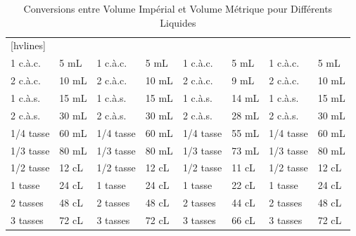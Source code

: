 \begin{table}
	\centering
	\caption{Conversions entre Volume Impérial et Volume Métrique pour Différents Liquides}
	\def\arraystretch{2}
	\begin{NiceTabular}{*{8}{m{.1\textwidth}}}[hvlines]
		 &       &            &       &  &         &            \\
		1 c.à.c.                     & 5 mL  & 1 c.à.c.                              & 5 mL  & 1 c.à.c.                              & 5 mL    & 1 c.à.c.                                & 5 mL  \\
		2 c.à.c.                     & 10 mL & 2 c.à.c.                              & 10 mL & 2 c.à.c.                              & 9 mL    & 2 c.à.c.                                & 10 mL \\
		1 c.à.s.                     & 15 mL & 1 c.à.s.                              & 15 mL & 1 c.à.s.                              & 14 mL   & 1 c.à.s.                                & 15 mL \\
		2 c.à.s.                     & 30 mL & 2 c.à.s.                              & 30 mL & 2 c.à.s.                              & 28 mL   & 2 c.à.s.                                & 30 mL \\
		1/4 tasse                    & 60 mL & 1/4 tasse                             & 60 mL & 1/4 tasse                             & 55 mL   & 1/4 tasse                               & 60 mL \\
		1/3 tasse                    & 80 mL & 1/3 tasse                             & 80 mL & 1/3 tasse                             & 73 mL   & 1/3 tasse                               & 80 mL \\
		1/2 tasse                    & 12 cL & 1/2 tasse                             & 12 cL & 1/2 tasse                             & 11 cL   & 1/2 tasse                               & 12 cL \\
		1 tasse                      & 24 cL & 1 tasse                               & 24 cL & 1 tasse                               & 22 cL   & 1 tasse                                 & 24 cL \\
		2 tasses                     & 48 cL & 2 tasses                              & 48 cL & 2 tasses                              & 44 cL   & 2 tasses                                & 48 cL \\
		3 tasses                     & 72 cL & 3 tasses                              & 72 cL & 3 tasses                              & 66 cL   & 3 tasses                                & 72 cL \\

\end{NiceTabular}
\end{table}
